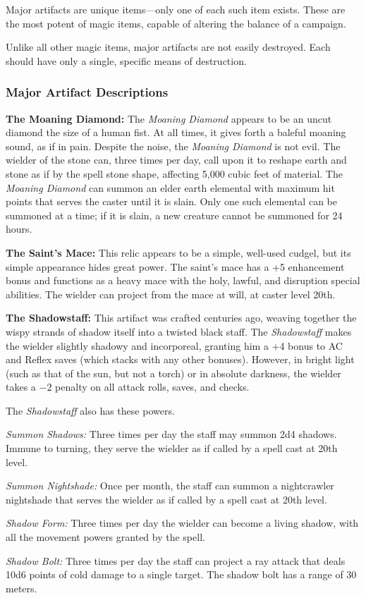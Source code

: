 Major artifacts are unique items—only one of each such item exists. These are the most potent of magic items, capable of altering the balance of a campaign.

Unlike all other magic items, major artifacts are not easily destroyed. Each should have only a single, specific means of destruction.

\subsubsection{Major Artifact Descriptions}

\textbf{The Moaning Diamond:} The \emph{Moaning Diamond} appears to be an uncut diamond the size of a human fist. At all times, it gives forth a baleful moaning sound, as if in pain. Despite the noise, the \emph{Moaning Diamond} is not evil. The wielder of the stone can, three times per day, call upon it to reshape earth and stone as if by the spell stone shape, affecting 5,000 cubic feet of material. The \emph{Moaning Diamond} can summon an elder earth elemental with maximum hit points that serves the caster until it is slain. Only one such elemental can be summoned at a time; if it is slain, a new creature cannot be summoned for 24 hours.

\textbf{The Saint's Mace:} This relic appears to be a simple, well-used cudgel, but its simple appearance hides great power. The saint's mace has a +5 enhancement bonus and functions as a heavy mace with the holy, lawful, and disruption special abilities. The wielder can project  from the mace at will, at caster level 20th.

\textbf{The Shadowstaff:} This artifact was crafted centuries ago, weaving together the wispy strands of shadow itself into a twisted black staff. The \emph{Shadowstaff} makes the wielder slightly shadowy and incorporeal, granting him a +4 bonus to AC and Reflex saves (which stacks with any other bonuses). However, in bright light (such as that of the sun, but not a torch) or in absolute darkness, the wielder takes a $-2$ penalty on all attack rolls, saves, and checks.

The \emph{Shadowstaff} also has these powers.
\begin{itemize*}
\item \textit{Summon Shadows:} Three times per day the staff may summon 2d4 shadows. Immune to turning, they serve the wielder as if called by a  spell cast at 20th level.
\item \textit{Summon Nightshade:} Once per month, the staff can summon a nightcrawler nightshade that serves the wielder as if called by a  spell cast at 20th level.
\item \textit{Shadow Form:} Three times per day the wielder can become a living shadow, with all the movement powers granted by the  spell.
\item \textit{Shadow Bolt:} Three times per day the staff can project a ray attack that deals 10d6 points of cold damage to a single target. The shadow bolt has a range of 30 meters.
\end{itemize*}
